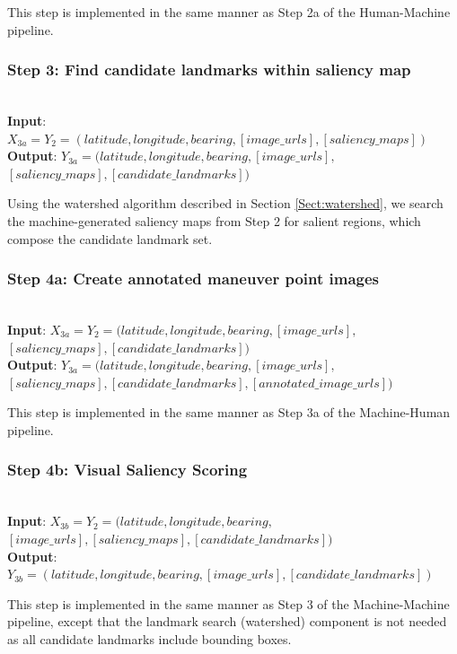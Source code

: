 This step is implemented in the same manner as Step 2a of the Human-Machine pipeline.

\subsubsection*{Step 3: Find candidate landmarks within saliency map}~\\
\noindent\textbf{Input}: $X_{3a} = Y_2 = (latitude, longitude, bearing, [image\_urls], [saliency\_maps])$ \\
\textbf{Output}: $Y_{3a} = (latitude, longitude, bearing, [image\_urls],$\\$ [saliency\_maps], [candidate\_landmarks])$ 

Using the watershed algorithm described in Section \ref{Sect:watershed}, we search the machine-generated saliency maps from Step 2 for salient regions, which compose the candidate landmark set.

\subsubsection*{Step 4a: Create annotated maneuver point images}~\\
\noindent\textbf{Input}: $X_{3a} = Y_2 = (latitude, longitude, bearing, [image\_urls], $\\$[saliency\_maps], [candidate\_landmarks])$ \\
\textbf{Output}: $Y_{3a} = (latitude, longitude, bearing, [image\_urls], $\\$[saliency\_maps], [candidate\_landmarks], [annotated\_image\_urls])$ 

This step is implemented in the same manner as Step 3a of the Machine-Human pipeline.

\subsubsection*{Step 4b: Visual Saliency Scoring}~\\
\noindent\textbf{Input}: $X_{3b} = Y_2 = (latitude, longitude, bearing, $\\$ [image\_urls], [saliency\_maps], [candidate\_landmarks] )$\\
\textbf{Output}: $Y_{3b} = (latitude, longitude, bearing,  [image\_urls], [candidate\_landmarks] )$ 

This step is implemented in the same manner as Step 3 of the Machine-Machine pipeline, except that the landmark search (watershed) component is not needed as all candidate landmarks include bounding boxes.

